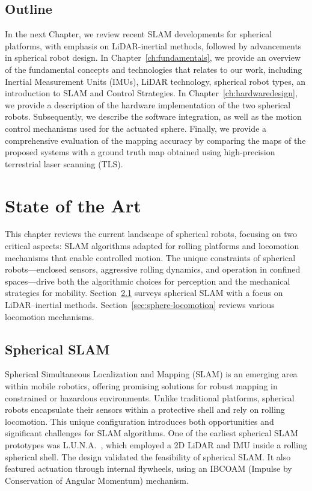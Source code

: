 \documentclass[english, bachelor, utf8]{base/thesis_telematics}
\begin{document}
\section{Outline}
In the next Chapter, we review recent SLAM developments for spherical platforms, with emphasis on LiDAR-inertial methods, followed by advancements in spherical robot design.
In Chapter~\ref{ch:fundamentals}, we provide an overview of the fundamental concepts and technologies that relates to our work, including Inertial Measurement Units (IMUs), LiDAR technology, spherical robot types, an introduction to SLAM and Control Strategies.
In Chapter~\ref{ch:hardwaredesign}, we provide a description of the hardware implementation of the two spherical robots. 
Subsequently, we describe the software integration, as well as the motion control mechanisms used for the actuated sphere. 
Finally, we provide a comprehensive evaluation of the mapping accuracy by comparing the maps of the proposed systems with a ground truth map obtained using high-precision terrestrial laser scanning (TLS). 


\chapter{State of the Art}
\label{ch:state-of-the-art}
This chapter reviews the current landscape of spherical robots, focusing on two critical aspects: SLAM algorithms adapted for rolling platforms and locomotion mechanisms that enable controlled motion. The unique constraints of spherical robots—enclosed sensors, aggressive rolling dynamics, and operation in confined spaces—drive both the algorithmic choices for perception and the mechanical strategies for mobility. Section~\ref{AA} surveys spherical SLAM with a focus on LiDAR–inertial methods. Section~\ref{sec:sphere-locomotion} reviews various locomotion mechanisms.

\section{Spherical SLAM}\label{AA}
Spherical Simultaneous Localization and Mapping (SLAM) is an emerging area within mobile robotics, offering promising solutions for robust mapping in constrained or hazardous environments. 
Unlike traditional platforms, spherical robots encapsulate their sensors within a protective shell and rely on rolling locomotion. 
This unique configuration introduces both opportunities and significant challenges for SLAM algorithms. 
One of the earliest spherical SLAM prototypes was L.U.N.A.~\cite{luna}, which employed a 2D LiDAR and IMU inside a rolling spherical shell. 
The design validated the feasibility of spherical SLAM. 
It also featured actuation through internal flywheels, using an IBCOAM (Impulse by Conservation of Angular Momentum) mechanism.
\end{document}
